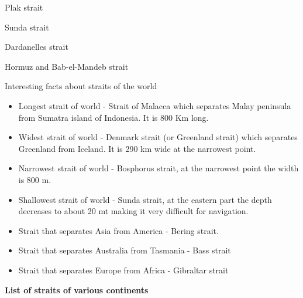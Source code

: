 \documentclass[
  openany]{book}
\providecommand{\tightlist}{%
  \setlength{\itemsep}{0pt}\setlength{\parskip}{0pt}}
\begin{document}
Plak strait

Sunda strait

Dardanelles strait

Hormuz and Bab-el-Mandeb strait

Interesting facts about straits of the world

\begin{itemize}
\tightlist
\item
  Longest strait of world - Strait of Malacca which separates Malay peninsula from Sumatra island of Indonesia. It is 800 Km long.
\item
  Widest strait of world - Denmark strait (or Greenland strait) which separates Greenland from Iceland. It is 290 km wide at the narrowest point.
\item
  Narrowest strait of world - Bosphorus strait, at the narrowest point the width is 800 m.
\item
  Shallowest strait of world - Sunda strait, at the eastern part the depth decreases to about 20 mt making it very difficult for navigation.
\item
  Strait that separates Asia from America - Bering strait.
\item
  Strait that separates Australia from Tasmania - Bass strait
\item
  Strait that separates Europe from Africa - Gibraltar strait
\end{itemize}

\textbf{List of straits of various continents}
\end{document}
